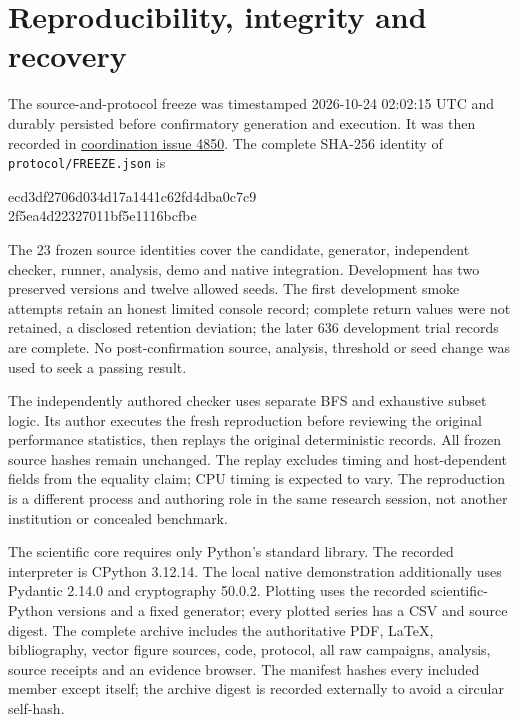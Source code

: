 \section{Reproducibility, integrity and recovery}
\label{sec:reproduction}
The source-and-protocol freeze was timestamped 2026-10-24 02:02:15 UTC and durably persisted before confirmatory generation and execution. It was then recorded in \href{https://github.com/MontrealAI/AGI-Alpha-Agent-v0/issues/4850\#issuecomment-6378518568}{coordination issue 4850}. The complete SHA-256 identity of \texttt{protocol/FREEZE.json} is
\begin{center}\small\ttfamily
 ecd3df2706d034d17a1441c62fd4dba0c7c9\\
 2f5ea4d22327011bf5e1116bcfbe
\end{center}
The 23 frozen source identities cover the candidate, generator, independent checker, runner, analysis, demo and native integration. Development has two preserved versions and twelve allowed seeds. The first development smoke attempts retain an honest limited console record; complete return values were not retained, a disclosed retention deviation; the later 636 development trial records are complete. No post-confirmation source, analysis, threshold or seed change was used to seek a passing result.

The independently authored checker uses separate BFS and exhaustive subset logic. Its author executes the fresh reproduction before reviewing the original performance statistics, then replays the original deterministic records. All frozen source hashes remain unchanged. The replay excludes timing and host-dependent fields from the equality claim; CPU timing is expected to vary. The reproduction is a different process and authoring role in the same research session, not another institution or concealed benchmark.

The scientific core requires only Python's standard library. The recorded interpreter is CPython 3.12.14. The local native demonstration additionally uses Pydantic 2.14.0 and cryptography 50.0.2. Plotting uses the recorded scientific-Python versions and a fixed generator; every plotted series has a CSV and source digest. The complete archive includes the authoritative PDF, LaTeX, bibliography, vector figure sources, code, protocol, all raw campaigns, analysis, source receipts and an evidence browser. The manifest hashes every included member except itself; the archive digest is recorded externally to avoid a circular self-hash.

